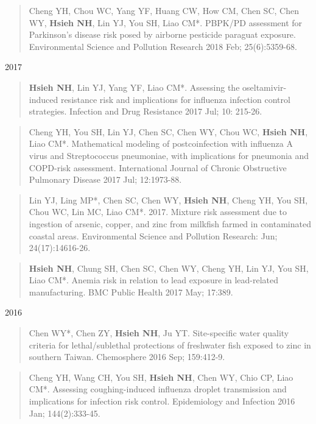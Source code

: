 \documentclass[10pt,]{article}
\begin{document}
\begin{quote}
Cheng YH, Chou WC, Yang YF, Huang CW, How CM, Chen SC, Chen WY,
\textbf{Hsieh NH}, Lin YJ, You SH, Liao CM*. PBPK/PD assessment for
Parkinson's disease risk posed by airborne pesticide paraguat exposure.
Environmental Science and Pollution Research 2018 Feb; 25(6):5359-68.
\end{quote}

2017

\begin{quote}
\textbf{Hsieh NH}, Lin YJ, Yang YF, Liao CM*. Assessing the
oseltamivir-induced resistance risk and implications for influenza
infection control strategies. Infection and Drug Resistance 2017 Jul;
10: 215-26.
\end{quote}

\begin{quote}
Cheng YH, You SH, Lin YJ, Chen SC, Chen WY, Chou WC, \textbf{Hsieh NH},
Liao CM*. Mathematical modeling of postcoinfection with influenza A
virus and Streptococcus pneumoniae, with implications for pneumonia and
COPD-risk assessment. International Journal of Chronic Obstructive
Pulmonary Disease 2017 Jul; 12:1973-88.
\end{quote}

\begin{quote}
Lin YJ, Ling MP*, Chen SC, Chen WY, \textbf{Hsieh NH}, Cheng YH, You SH,
Chou WC, Lin MC, Liao CM*. 2017. Mixture risk assessment due to
ingestion of arsenic, copper, and zinc from milkfish farmed in
contaminated coastal areas. Environmental Science and Pollution
Research: Jun; 24(17):14616-26.
\end{quote}

\begin{quote}
\textbf{Hsieh NH}, Chung SH, Chen SC, Chen WY, Cheng YH, Lin YJ, You SH,
Liao CM*. Anemia risk in relation to lead exposure in lead-related
manufacturing. BMC Public Health 2017 May; 17:389.
\end{quote}

2016

\begin{quote}
Chen WY*, Chen ZY, \textbf{Hsieh NH}, Ju YT. Site-specific water quality
criteria for lethal/sublethal protections of freshwater fish exposed to
zinc in southern Taiwan. Chemosphere 2016 Sep; 159:412-9.
\end{quote}

\begin{quote}
Cheng YH, Wang CH, You SH, \textbf{Hsieh NH}, Chen WY, Chio CP, Liao
CM*. Assessing coughing-induced influenza droplet transmission and
implications for infection risk control. Epidemiology and Infection 2016
Jan; 144(2):333-45.
\end{quote}
\end{document}
